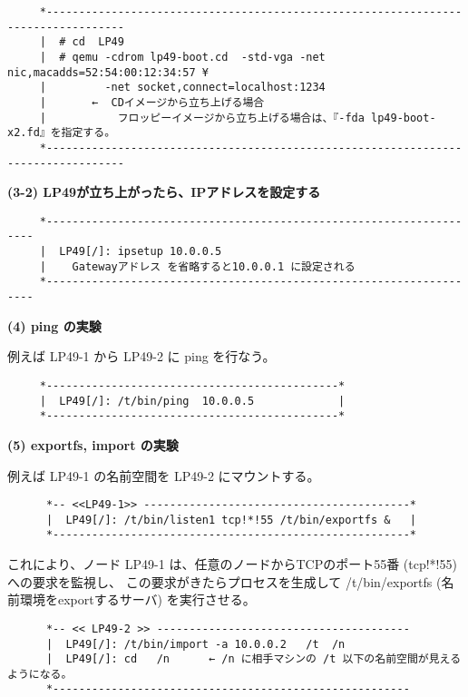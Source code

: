 \begin{verbatim}
     *----------------------------------------------------------------------------------
     |  # cd  LP49                                                                 
     |  # qemu -cdrom lp49-boot.cd  -std-vga -net nic,macadds=52:54:00:12:34:57 ¥  
     |         -net socket,connect=localhost:1234                                  
     |       ←  CDイメージから立ち上げる場合                                       
     |           フロッピーイメージから立ち上げる場合は、『-fda lp49-boot-x2.fd』を指定する。
     *----------------------------------------------------------------------------------
\end{verbatim}

{\bf (3-2) LP49が立ち上がったら、IPアドレスを設定する}\\
\begin{verbatim}
     *--------------------------------------------------------------------
     |  LP49[/]: ipsetup 10.0.0.5                                 
     |    Gatewayアドレス を省略すると10.0.0.1 に設定される       
     *--------------------------------------------------------------------
\end{verbatim}
     
{\bf (4)  ping の実験}

       例えば LP49-1 から LP49-2 に ping を行なう。
\begin{verbatim}
     *---------------------------------------------*    
     |  LP49[/]: /t/bin/ping  10.0.0.5             |    
     *---------------------------------------------*    
\end{verbatim}

    
{\bf  (5) exportfs, import  の実験}

       例えば LP49-1 の名前空間を  LP49-2 にマウントする。
\begin{verbatim}
      *-- <<LP49-1>> -----------------------------------------* 
      |  LP49[/]: /t/bin/listen1 tcp!*!55 /t/bin/exportfs &   | 
      *-------------------------------------------------------* 
\end{verbatim}

   これにより、ノード LP49-1 は、任意のノードからTCPのポート55番 (tcp!*!55) への要求を監視し、
   この要求がきたらプロセスを生成して /t/bin/exportfs (名前環境をexportするサーバ) を実行させる。

\begin{verbatim}    
      *-- << LP49-2 >> ---------------------------------------
      |  LP49[/]: /t/bin/import -a 10.0.0.2   /t  /n       
      |  LP49[/]: cd   /n      ← /n に相手マシンの /t 以下の名前空間が見えるようになる。
      *-------------------------------------------------------
\end{verbatim}

